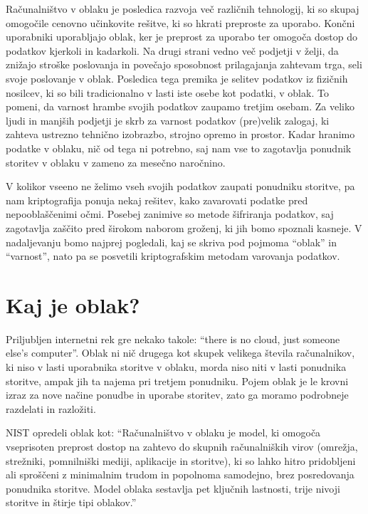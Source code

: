 \documentclass[12pt,a4paper,openany,tikz]{book}
\theoremstyle{plain}
\theoremstyle{definition}
\begin{document}
Računalništvo v oblaku je posledica razvoja več različnih tehnologij, ki so skupaj omogočile cenovno učinkovite rešitve, ki so hkrati preproste za uporabo. Končni uporabniki uporabljajo oblak, ker je preprost za uporabo ter omogoča dostop do podatkov kjerkoli in kadarkoli. Na drugi strani vedno več podjetji v želji, da znižajo stroške poslovanja in povečajo sposobnost prilagajanja zahtevam trga, seli svoje poslovanje v oblak. Posledica tega premika je selitev podatkov iz fizičnih nosilcev, ki so bili tradicionalno v lasti iste osebe kot podatki, v oblak. To pomeni, da varnost hrambe svojih podatkov zaupamo tretjim osebam. Za veliko ljudi in manjših podjetji je skrb za varnost podatkov (pre)velik zalogaj, ki zahteva ustrezno tehnično izobrazbo, strojno opremo in prostor. Kadar hranimo podatke v oblaku, nič od tega ni potrebno, saj nam vse to zagotavlja ponudnik storitev v oblaku v zameno za mesečno naročnino.

V kolikor vseeno ne želimo vseh svojih podatkov zaupati ponudniku storitve, pa nam kriptografija ponuja nekaj rešitev, kako zavarovati podatke pred nepooblaščenimi očmi. Posebej zanimive so metode šifriranja podatkov, saj zagotavlja zaščito pred širokom naborom groženj, ki jih bomo spoznali kasneje.  V nadaljevanju bomo najprej pogledali, kaj se skriva pod pojmoma ``oblak'' in ``varnost'', nato pa se posvetili kriptografskim metodam varovanja podatkov.

\section{Kaj je oblak?}
\label{sec:Kaj je oblak?}


Priljubljen internetni rek gre nekako takole: “there is no cloud, just someone else's computer”. Oblak ni nič drugega kot skupek velikega števila računalnikov, ki niso v lasti uporabnika storitve v oblaku, morda niso niti v lasti ponudnika storitve, ampak jih ta najema pri tretjem ponudniku. Pojem oblak je le krovni izraz za nove načine ponudbe in uporabe storitev, zato ga moramo podrobneje razdelati in razložiti.

NIST opredeli oblak kot: ``Računalništvo v oblaku je model, ki omogoča vseprisoten preprost dostop na zahtevo do skupnih računalniških virov (omrežja, strežniki, pomnilniški mediji, aplikacije in storitve), ki so lahko hitro pridobljeni ali sproščeni z minimalnim trudom in popolnoma samodejno, brez posredovanja ponudnika storitve. Model oblaka sestavlja pet ključnih lastnosti, trije nivoji storitve in štirje tipi oblakov.''~\cite{mell2011nist}
\end{document}
